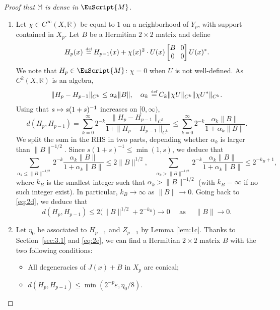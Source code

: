 \documentclass[10pt]{amsart}
\let\pazocal\EuScript
\def\mto{\mathchoice{\longmapsto}{\mapsto}{\mapsto}{\mapsto}}
\theoremstyle{definition}
\newcommand{\MM}{\pazocal{M}}
\newcommand{\R}{\mathbb{R}}
\newcommand{\Mm}{\mathbb{M}}
\let\az\alpha
\let\epsi\varepsilon
\newcommand{\matrice}[1]{\arraycolsep3.5pt\begin{bmatrix}#1\end{bmatrix}}
\newcommand{\de}{\,\mathrel{\stackrel{\makebox[0pt]{\mbox{\normalfont\tiny def}}}{=}}}
\begin{document}
\begin{proof}[Proof that $\Mm$ is dense in $\MM$]
\begin{enumerate}
\item
Let $\chi \in C^\infty(X,\R)$ be equal to $1$ on a neighborhood of $Y_p$, with support contained in $X_p$. Let $B$ be a Hermitian $2 \times 2$ matrix and define
\begin{equation}\label{eq:1r}
H_p(x) \de H_{p-1}(x) + \chi(x)^2 \cdot U(x) \matrice{ B & 0 \\ 0 & 0}U(x)^*.
\end{equation}
We note that
$H_p \in \MM$: $\chi = 0$ when $U$ is not well-defined. As $C^k(X,\R)$ is an algebra,
\begin{equation*}
\| H_p-H_{p-1} \|_{C^k} \leq \az_k \|B\|, \quad \az_k \de C_k \| \chi U \|_{C^k} \| \chi U^* \|_{C^k}.
\end{equation*}
Using that $s \mto s(1+s)^{-1}$ increases on $[0,\infty)$,
\begin{equation}\label{eq:2d}
d(H_p,H_{p-1}) = \sum_{k=0}^\infty 2^{-k} \dfrac{\| H_p-H_{p-1} \|_{C^k} }{1+\| H_p - H_{p-1}\|_{C^k}} \leq \sum_{k=0}^\infty 2^{-k} \dfrac{\az_k \|B\| }{1+\az_k \|B\|}.
\end{equation}
We split the sum in the RHS in two parts, depending whether $\az_k$ is larger than $\|B\|^{-1/2}$. Since $s(1+s)^{-1} \leq \min(1,s)$, we deduce that
\begin{equation*}
\sum_{\az_k \leq \|B\|^{-1/2} } 2^{-k} \dfrac{\az_k \|B\| }{1+\az_k \|B\|} \leq 2\|B\|^{1/2}, \quad \sum_{\az_k > \|B\|^{-1/2} } 2^{-k} \dfrac{\az_k \|B\| }{1+\az_k \|B\|} \leq 2^{-k_B+1},
\end{equation*}
where $k_B$ is the smallest integer such that $\az_k > \| B \|^{-1/2}$ (with $k_B = \infty$ if no such integer exist). In particular, $k_B \to \infty$ as $\| B \| \to 0$. Going back to \eqref{eq:2d}, we deduce that
\begin{equation}\label{eq:2e}
d(H_p,H_{p-1}) \leq 2 \bigl(\| B \|^{1/2} + 2^{-k_B}\bigr) \to 0 \quad \text{ as } \quad \| B \| \to 0.
\end{equation}

\item
Let $\eta_0$ be associated to $H_{p-1}$ and $Z_{p-1}$ by Lemma \ref{lem:1c}.
Thanks to Section~\ref{sec:3.1} and \eqref{eq:2e}, we can find a Hermitian $2 \times 2$ matrix $B$ with the two following conditions:
\begin{itemize}
\item All degeneracies of $J(x) + B$ in $X_p$ are conical;
\item $d(H_p,H_{p-1}) \leq \min\left(2^{-p} \epsi,\eta_0/8\right)$.
\end{itemize}


\end{enumerate}
\end{proof}
\end{document}
